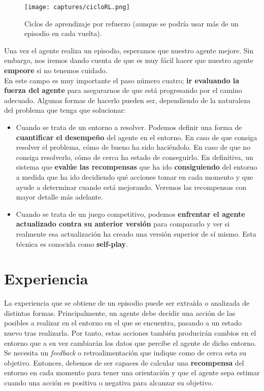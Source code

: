 \documentclass[11pt,fleqn]{book} %
\begin{document}
\begin{figure}[H]
	\centering\texttt{[image: captures/cicloRL.png]}
	\caption{Ciclos de aprendizaje por refuerzo (aunque se podría usar más de un episodio en cada vuelta).}
	\label{fig:cicloRL} %
\end{figure}

Una vez el agente realiza un episodio, esperamos que nuestro agente mejore. Sin embargo, nos iremos dando cuenta de que es muy fácil hacer que nuestro agente \textbf{empeore} si no tenemos cuidado. \\

En este campo es muy importante el paso número cuatro; \textbf{ir evaluando la fuerza del agente} para asegurarnos de que está progresando por el camino adecuado. Algunas formas de hacerlo pueden ser, dependiendo de la naturaleza del problema que tenga que solucionar: \\

\begin{itemize}
	\item Cuando se trata de un entorno a resolver. Podemos definir una forma de \textbf{cuantificar el desempeño} del agente en el entorno. En caso de que consiga resolver el problema, cómo de bueno ha sido haciéndolo. En caso de que no consiga resolverlo, cómo de cerca ha estado de conseguirlo. En definitiva, un sistema que \textbf{evalúe las recompensas} que ha ido \textbf{consiguiendo} del entorno a medida que ha ido decidiendo qué acciones tomar en cada momento y que ayude a determinar cuando está mejorando. Veremos las recompensas con mayor detalle más adelante. \\
	
	\item Cuando se trata de un juego competitivo, podemos \textbf{enfrentar el agente actualizado contra su anterior versión} para compararlo y ver si realmente esa actualización ha creado una versión superior de sí mismo. Esta técnica es conocida como \textbf{self-play}.
\end{itemize}  

\section{Experiencia}\label{sec:experiencia}

La experiencia que se obtiene de un episodio puede ser extraída o analizada de distintas formas. Principalmente, un agente debe decidir una acción de las posibles a realizar en el entorno en el que se encuentra, pasando a un estado nuevo tras realizarla. Por tanto, estas acciones también producirán cambios en el entorno que a su vez cambiarán los datos que percibe el agente de dicho entorno. Se necesita un \textit{feedback} o retroalimentación que indique como de cerca esta su objetivo. Entonces, debemos de ser capaces de calcular una \textbf{recompensa} del entorno en cada momento para tener una orientación y que el agente sepa estimar cuando una acción es positiva o negativa para alcanzar su objetivo. \\
\end{document}
